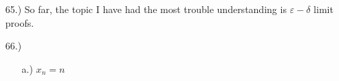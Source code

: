 \documentclass[12pt]{article}
\newcommand{\vertb}[1]{\left\vert#1\right\vert}
\newcommand{\e}{\varepsilon}
\begin{document}
\begin{itemize}











    \item [65.)] So far, the topic I have had the most trouble understanding is $\e-\delta$ limit proofs.

    \item [66.)] \begin{itemize}
        \item [a.)] $x_n=n$


\end{itemize}
\end{itemize}
\end{document}
